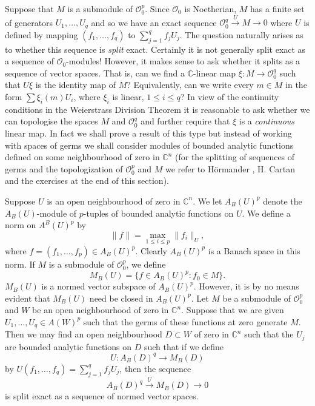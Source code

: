 Suppose that $M$ is a submodule of $\mathcal O_0^p$. Since $\mathcal O_0$ is Noetherian, $M$ has a finite set of generators $U_1,\ldots,U_q$ and so we have an exact sequence $\mathcal O_0^q\xrightarrow{U}M\to0$ where $U$ is defined by mapping $(f_1,\ldots,f_q)$ to $\sum_{j=1}^q f_jU_j$. The question naturally arises as to whether this sequence is \emph{split} exact. Certainly it is not generally split exact as a sequence of $\mathcal O_0$-modules! However, it makes sense to ask whether it splits as a sequence of vector spaces. That is, can we find a $\mathbb C$-linear map $\xi:M\to\mathcal O_0^q$ such that $U\xi$ is the identity map of $M$? Equivalently, can we write every $m\in M$ in the form $\sum\xi_i(m)U_i$, where $\xi_i$ is linear, $1\leq i\leq q$? In view of the continuity conditions in the Weierstrass Division Theorem it is reasonable to ask whether we can topologise the spaces $M$ and $\mathcal O_0^q$ and further require that $\xi$ is a \emph{continuous} linear map. In fact we shall prove a result of this type but instead of working with spaces of germs we shall consider modules of bounded analytic functions defined on
some neighbourhood of zero in $\mathbb C^n$ (for the splitting of sequences of germs and the topologization of $\mathcal O_0^p$ and $M$ we refer to H\"ormander \cite{bib:I:hormander-l:1}, H. Cartan \cite[Seminar 11]{bib:I:cartan-h:2} and the exercises at the end of this section).

Suppose $U$ is an open neighbourhood of zero in $\mathbb C^n$. We let $A_B(U)^p$ denote the $A_B(U)$-module of $p$-tuples of bounded analytic functions on $U$. We define a norm on $A^B(U)^p$ by
\[\|f\|=\max_{1\leq i\leq p}\|f_i\|_U,\]
where $f=(f_1,\ldots,f_p)\in A_B(U)^p$. Clearly $A_B(U)^p$ is a Banach space in this norm. If $M$ is a submodule of $\mathcal O_0^p$, we define
\[M_B(U)=\{f\in A_B(U)^p:f_0\in M\}.\]
$M_B(U)$ is a normed vector subspace of $A_B(U)^p$. However, it is by no means evident that $M_B(U)$ need be closed in $A_B(U)^p$.
 Let $M$ be a submodule of $\mathcal O_0^p$ and $W$ be an open neighbourhood of zero in $\mathbb C^n$. Suppose that we are given $U_1,\ldots,U_q\in A(W)^p$ such that the germs of these functions at zero generate $M$. Then we may find an open neighbourhood $D\subset W$ of zero in $\mathbb C^n$ such that the $U_j$ are bounded analytic functions on $D$ such that if we define
\[U:A_B(D)^q\to M_B(D)\]
by $U(f_1,\ldots,f_q)=\sum_{j=1}^q f_jU_j$, then the sequence
\[A_B(D)^q\xrightarrow{U}M_B(D)\to0\]
is split exact as a sequence of normed vector spaces.

